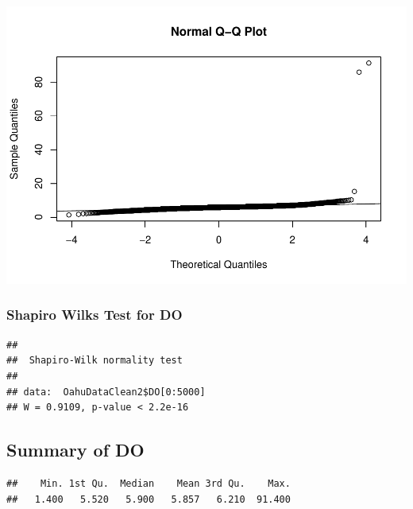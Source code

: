 \documentclass[12pt,]{article}
\newenvironment{Shaded}{\begin{snugshade}}{\end{snugshade}}
\newcommand{\KeywordTok}[1]{\textcolor[rgb]{0.13,0.29,0.53}{\textbf{#1}}}
\newcommand{\DecValTok}[1]{\textcolor[rgb]{0.00,0.00,0.81}{#1}}
\newcommand{\OperatorTok}[1]{\textcolor[rgb]{0.81,0.36,0.00}{\textbf{#1}}}
\newcommand{\NormalTok}[1]{#1}
\begin{document}
\includegraphics{Garcia_ENV872_Project_files/figure-latex/unnamed-chunk-33-1.pdf}

\subsubsection{Shapiro Wilks Test for
DO}\label{shapiro-wilks-test-for-do}

\begin{Shaded}
\end{Shaded}

\begin{verbatim}
## 
##  Shapiro-Wilk normality test
## 
## data:  OahuDataClean2$DO[0:5000]
## W = 0.9109, p-value < 2.2e-16
\end{verbatim}

\subsection{Summary of DO}\label{summary-of-do}

\begin{Shaded}
\end{Shaded}

\begin{verbatim}
##    Min. 1st Qu.  Median    Mean 3rd Qu.    Max. 
##   1.400   5.520   5.900   5.857   6.210  91.400
\end{verbatim}
\end{document}
